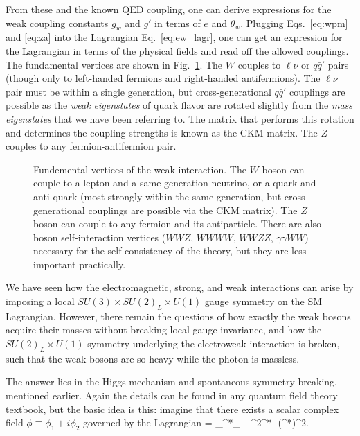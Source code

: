 From these and the known QED coupling, one can derive expressions for the weak coupling
constants $g_w$ and $g'$ in terms of $e$ and $\theta_w$. Plugging Eqs.~\ref{eq:wpm}
and \ref{eq:za} into the Lagrangian Eq.~\ref{eq:ew_lagr}, one can get an expression
for the Lagrangian in terms of the physical fields and read off the allowed couplings.
The fundamental vertices are shown in Fig.~\ref{fig:weak_diagrams}. The $W$ couples
to $\ell\nu$ or $q\bar{q}'$ pairs (though only to left-handed fermions
and right-handed antifermions). The $\ell\nu$ pair must be within a single generation,
but cross-generational $q\bar{q}'$ couplings are possible as the \textit{weak eigenstates}
of quark flavor are rotated slightly from the \textit{mass eigenstates} that we have been
referring to. The matrix that performs this rotation and determines the coupling strengths
is known as the CKM matrix.
The $Z$ couples to any fermion-antifermion pair.

\begin{figure}[t]
  \addtolength{\abovecaptionskip}{5mm}
  \centering
  \vskip5mm
  
  
  
    \caption{Fundemental vertices of the weak interaction. The $W$ boson can couple to a lepton
      and a same-generation neutrino, or a quark and anti-quark (most strongly within the same
      generation, but cross-generational couplings are possible via the CKM matrix).
      The $Z$ boson can couple to any fermion and its antiparticle. There are also
      boson self-interaction vertices ($WWZ$, $WWWW$, $WWZZ$, $\gamma\gamma WW$) necessary for the self-consistency 
      of the theory, but they are less important practically.
            }
    \label{fig:weak_diagrams}
\end{figure}

We have seen how the electromagnetic, strong, and weak interactions can arise by imposing
a local $SU(3)\times SU(2)_L\times U(1)$ gauge symmetry on the SM Lagrangian.
However, there remain the questions of how exactly the weak bosons acquire their masses without breaking
local gauge invariance, and how the $SU(2)_L\times U(1)$ symmetry underlying the electroweak
interaction is broken, such that the weak bosons are so heavy while the photon is massless.

The answer lies in the Higgs mechanism and spontaneous symmetry breaking, mentioned earlier.
Again the details can be found in any quantum field theory textbook, but the basic idea is this:
imagine that there exists a scalar complex field $\phi\equiv\phi_1+i\phi_2$ governed by the Lagrangian
\be
{} = \partial_\mu\phi^*\partial_\mu\phi + \mu^2\phi^*\phi - (\phi^*\phi)^2.
\ee

